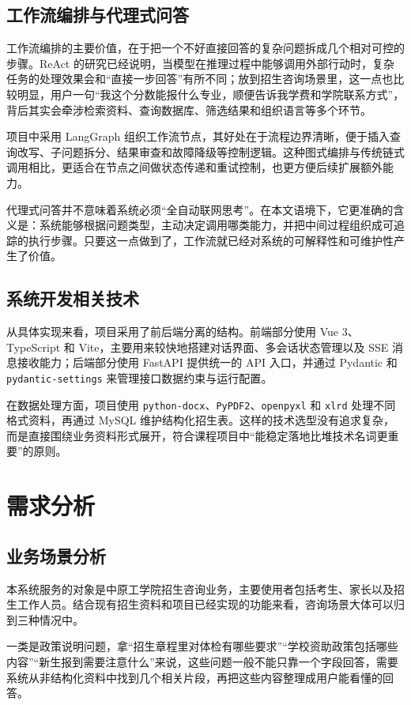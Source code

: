 \documentclass[UTF8,zihao=-4,oneside]{ctexbook}
\numberwithin{equation}{chapter}
\begin{document}
\section{工作流编排与代理式问答}
工作流编排的主要价值，在于把一个不好直接回答的复杂问题拆成几个相对可控的步骤。ReAct 的研究已经说明，当模型在推理过程中能够调用外部行动时，复杂任务的处理效果会和“直接一步回答”有所不同\cite{react2023}；放到招生咨询场景里，这一点也比较明显，用户一句“我这个分数能报什么专业，顺便告诉我学费和学院联系方式”，背后其实会牵涉检索资料、查询数据库、筛选结果和组织语言等多个环节。

项目中采用 LangGraph 组织工作流节点，其好处在于流程边界清晰，便于插入查询改写、子问题拆分、结果审查和故障降级等控制逻辑\cite{projectanalysis}。这种图式编排与传统链式调用相比，更适合在节点之间做状态传递和重试控制，也更方便后续扩展额外能力。

代理式问答并不意味着系统必须“全自动联网思考”。在本文语境下，它更准确的含义是：系统能够根据问题类型，主动决定调用哪类能力，并把中间过程组织成可追踪的执行步骤。只要这一点做到了，工作流就已经对系统的可解释性和可维护性产生了价值。

\section{系统开发相关技术}
从具体实现来看，项目采用了前后端分离的结构。前端部分使用 Vue 3、TypeScript 和 Vite，主要用来较快地搭建对话界面、多会话状态管理以及 SSE 消息接收能力；后端部分使用 FastAPI 提供统一的 API 入口，并通过 Pydantic 和 \texttt{pydantic-settings} 来管理接口数据约束与运行配置\cite{projectreadme,projectanalysis}。

在数据处理方面，项目使用 \texttt{python-docx}、\texttt{PyPDF2}、\texttt{openpyxl} 和 \texttt{xlrd} 处理不同格式资料，再通过 MySQL 维护结构化招生表。这样的技术选型没有追求复杂，而是直接围绕业务资料形式展开，符合课程项目中“能稳定落地比堆技术名词更重要”的原则。

\chapter{需求分析}

\section{业务场景分析}
本系统服务的对象是中原工学院招生咨询业务，主要使用者包括考生、家长以及招生工作人员。结合现有招生资料和项目已经实现的功能来看，咨询场景大体可以归到三种情况中。

一类是政策说明问题，拿“招生章程里对体检有哪些要求”“学校资助政策包括哪些内容”“新生报到需要注意什么”来说，这些问题一般不能只靠一个字段回答，需要系统从非结构化资料中找到几个相关片段，再把这些内容整理成用户能看懂的回答。
\end{document}
